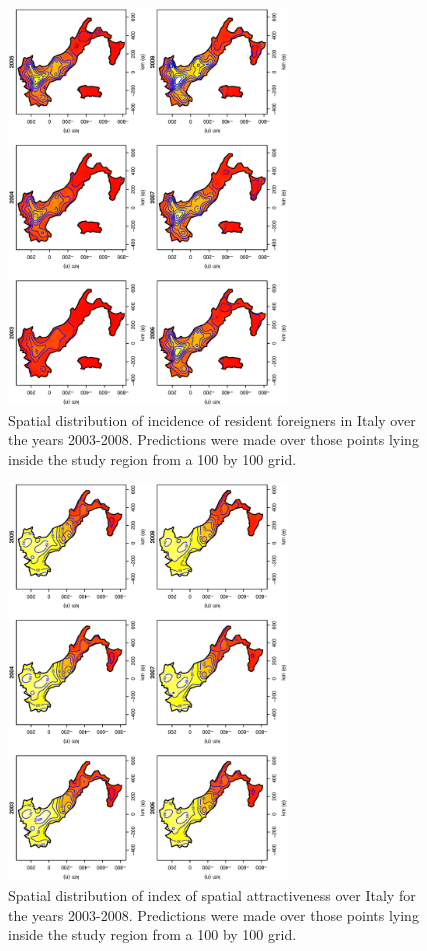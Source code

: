 \documentclass[10pt] {article}
\theoremstyle{definition}
\theoremstyle{plain}
\begin{document}
\begin{figure}[htbp]
	\centering
		\includegraphics[width=0.66\textwidth, angle=270]{SmoothPlot.eps}
	\caption{Spatial distribution of incidence of resident foreigners in Italy over the years 2003-2008. Predictions were made over those points lying inside the study region from a 100 by 100 grid.}
	\label{fig2}
\end{figure}

\begin{figure}[htbp]
	\centering
		\includegraphics[width=0.66\textwidth, angle=270]{index.eps}
	\caption{Spatial distribution of index of spatial attractiveness over Italy for the years 2003-2008. Predictions were made over those points lying inside the study region from a 100 by 100 grid.}
	\label{fig3}
\end{figure}
\end{document}
